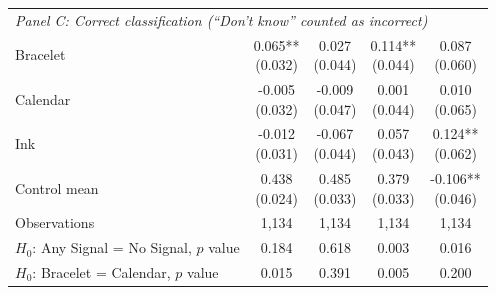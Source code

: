 {\begin{tabular}[t]{lcccc}
\multicolumn{5}{l}{\textit{Panel C: Correct classification (``Don't know'' counted as incorrect)}} \\
Bracelet & \makecell[c]{0.065**\\{(0.032)}} & \makecell[c]{0.027\\{(0.044)}} & \makecell[c]{0.114**\\{(0.044)}} & \makecell[c]{0.087\\{(0.060)}}\\
Calendar & \makecell[c]{-0.005\\{(0.032)}} & \makecell[c]{-0.009\\{(0.047)}} & \makecell[c]{0.001\\{(0.044)}} & \makecell[c]{0.010\\{(0.065)}}\\
Ink & \makecell[c]{-0.012\\{(0.031)}} & \makecell[c]{-0.067\\{(0.044)}} & \makecell[c]{0.057\\{(0.043)}} & \makecell[c]{0.124**\\{(0.062)}}\\
\midrule
Control mean & \makecell[c]{0.438\\{(0.024)}} & \makecell[c]{0.485\\{(0.033)}} & \makecell[c]{0.379\\{(0.033)}} & \makecell[c]{-0.106**\\{(0.046)}}\\
Observations & 1{,}134 & 1{,}134 & 1{,}134 & 1{,}134\\
\(H_0\): Any Signal = No Signal, \(p\) value & 0.184 & 0.618 & 0.003 & 0.016\\
\(H_0\): Bracelet = Calendar, \(p\) value & 0.015 & 0.391 & 0.005 & 0.200\\
\bottomrule
\end{tabular}}